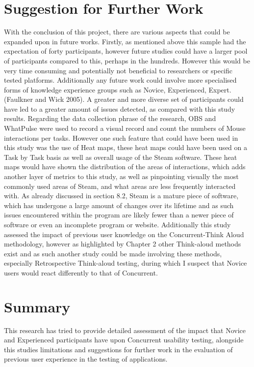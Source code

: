 \section{Suggestion for Further Work}
With the conclusion of this project, there are various aspects that could be expanded upon in future works. Firstly, as mentioned above this sample had the expectation of forty participants, however future studies could have a larger pool of participants compared to this, perhaps in the hundreds. However this would be very time consuming and potentially not beneficial to researchers or specific tested platforms. Additionally any future work could involve more specialised forms of knowledge experience groups such as Novice, Experienced, Expert. (Faulkner and Wick 2005). A greater and more diverse set of participants could have led to a greater amount of issues detected, as compared with this study results. Regarding the data collection phrase of the research, OBS and WhatPulse were used to record a visual record and count the numbers of Mouse interactions per tasks. However one such feature that could have been used in this study was the use of Heat maps, these heat maps could have been used on a Task by Task basis as well as overall usage of the Steam software. These heat maps would have shown the distribution of the areas of interactions, which adds another layer of metrics to this study, as well as pinpointing visually the most commonly used areas of Steam, and what areas are less frequently interacted with.
As already discussed in section 8.2, Steam is a mature piece of software, which has undergone a large amount of changes over its lifetime and as such issues encountered within the program are likely fewer than a newer piece of software or even an incomplete program or website. Additionally this study assessed the impact of previous user knowledge on the Concurrent-Think Aloud methodology, however as highlighted by Chapter 2 other Think-aloud methods exist and as such another study could be made involving these methods, especially Retrospective Think-aloud testing, during which I suspect that Novice users would react differently to that of Concurrent.

\section{Summary}
This research has tried to provide detailed assessment of the impact that Novice and Experienced participants have upon Concurrent usability testing, alongside this studies limitations and suggestions for further work in the evaluation of previous user experience in the testing of applications. 
